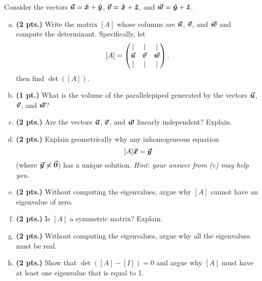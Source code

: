 \documentclass[12pt]{amsbook}
\begin{document}
\newpage
\begin{problem}
Consider the vectors $\boldsymbol{\boldsymbol{\vec{u}}} = \boldsymbol{\hat{x}} + \boldsymbol{\hat{y}}$, $\boldsymbol{\boldsymbol{\vec{v}}} = \boldsymbol{\hat{x}}+\boldsymbol{\hat{z}}$, and $\boldsymbol{\boldsymbol{\vec{w}}} = \boldsymbol{\hat{y}} + \boldsymbol{\hat{z}}$.  
\begin{enumerate}[(a)]
    \item \textbf{(2 pts.)} Write the matrix $[A]$ whose columns are $\boldsymbol{\boldsymbol{\vec{u}}}$, $\boldsymbol{\boldsymbol{\vec{v}}}$, and $\boldsymbol{\boldsymbol{\vec{w}}}$ and compute the determinant. Specifically, let
    \[
    [A]=\begin{pmatrix} \vert & \vert & \vert \\ \boldsymbol{\boldsymbol{\vec{u}}} & \boldsymbol{\boldsymbol{\vec{v}}} & \boldsymbol{\boldsymbol{\vec{w}}} \\ \vert & \vert & \vert \end{pmatrix}.
    \]
    then find $\det([A])$.
    \item \textbf{(1 pt.)} What is the volume of the parallelepiped generated by the vectors $\boldsymbol{\boldsymbol{\vec{u}}}$, $\boldsymbol{\boldsymbol{\vec{v}}}$, and $\boldsymbol{\boldsymbol{\vec{w}}}$?
    \item \textbf{(2 pts.)} Are the vectors $\boldsymbol{\boldsymbol{\vec{u}}}$, $\boldsymbol{\boldsymbol{\vec{v}}}$, and $\boldsymbol{\boldsymbol{\vec{w}}}$ linearly independent? Explain.
    \item \textbf{(2 pts.)} Explain geometrically why any inhomogeneous equation 
    \[
    [A]\boldsymbol{\boldsymbol{\vec{x}}} = \boldsymbol{\boldsymbol{\vec{y}}}
    \]
    (where $\boldsymbol{\boldsymbol{\vec{y}}}\neq \boldsymbol{\vec{0}}$) has a unique solution.  \emph{Hint: your answer from (c) may help you.}
    \item \textbf{(2 pts.)} Without computing the eigenvalues, argue why $[A]$ cannot have an eigenvalue of zero.
    \item \textbf{(2 pts.)} Is $[A]$ a symmetric matrix? Explain.
    \item \textbf{(2 pts.)} Without computing the eigenvalues, argue why all the eigenvalues must be real.
    \item \textbf{(2 pts.)} Show that $\det([A]-[I])=0$ and argue why $[A]$ must have at least one eigenvalue that is equal to 1.
\end{enumerate}
\end{problem}
\end{document}
